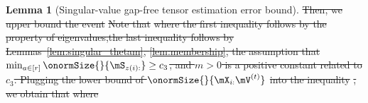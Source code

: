 \documentclass[lettersize,onecolumn,journal]{IEEEtran}
\theoremstyle{definition}
\newtheorem{lem}{Lemma}
\theoremstyle{definition}
\newcommand{\offf}[1]{\left\{#1\right\}}
\newcommand{\ang}[1]{\left\langle#1\right\rangle}
\def\fixme#1#2{\textbf{\color{red}[FIXME (#1): #2]}}
\providecommand{\DIFdeltex}[1]{{\protect\color{red}\sout{#1}}}                      %
\providecommand{\DIFdel}[1]{\texorpdfstring{\DIFdeltex{#1}}{}} %
\begin{document}
\begin{lem}[Singular-value gap-free tensor estimation error bound]
    \DIFdel{Then, we upper bound the event
    }%
\DIFdel{Note that 
    }%
\DIFdel{where the first inequality follows by the property of eigenvalues,the last inequality follows by Lemmas~\ref{lem:singular_thetam}, \ref{lem:membership}, the assumption that $\min_{a \in [r]} \onormSize{}{\mS_{z(i):}} \geq c_3$, and $m >0$ is a positive constant related to $ c_3$. Plugging the lower bound of $ \onormSize{}{\mX_{i:} \mV^{(t)}}$ }%
\DIFdel{into the inequality }%
\DIFdel{, we obtain that 
    }%
\DIFdel{where 
    }%


\end{lem}
\end{document}
